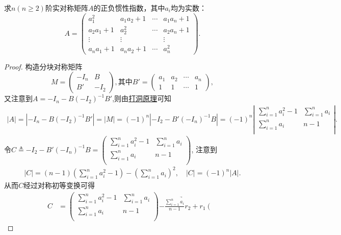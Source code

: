 \documentclass[../../main.tex]{subfiles}%
\begin{document}
\begin{proposition}
求\(n(n\geqslant 2)\)阶实对称矩阵\(A\)的正负惯性指数，其中\(a_i\)均为实数：
\[
A = \begin{pmatrix}
a_1^2 & a_1a_2 + 1 & \cdots & a_1a_n + 1 \\
a_2a_1 + 1 & a_2^2 & \cdots & a_2a_n + 1 \\
\vdots & \vdots & & \vdots \\
a_na_1 + 1 & a_na_2 + 1 & \cdots & a_n^2
\end{pmatrix}.
\]
\end{proposition} 
\begin{proof}
构造分块对称矩阵
\[
M = \begin{pmatrix}
-I_n & B \\
B' & -I_2
\end{pmatrix}, \text{其中} B' = \begin{pmatrix}
a_1 & a_2 & \cdots & a_n \\
1 & 1 & \cdots & 1
\end{pmatrix},
\]
又注意到$A=-I_n-B(-I_2)^{-1}B'$,则由\hyperref[proposition:打洞原理]{打洞原理}可知
\begin{align*}
\left| A \right|=\left| -I_n-B(-I_2)^{-1}B' \right|=\left| M \right|=\left( -1 \right) ^n\left| -I_2-B' (-I_n)^{-1}B \right|=\left( -1 \right) ^n\left| \begin{matrix}
\sum_{i=1}^n{a_{i}^{2}}-1&		\sum_{i=1}^n{a_i}\\
\sum_{i=1}^n{a_i}&		n-1\\
\end{matrix} \right|.
\end{align*}
令$C\triangleq -I_2-B' (-I_n)^{-1}B=\left( \begin{matrix}
\sum_{i=1}^n{a_{i}^{2}}-1&		\sum_{i=1}^n{a_i}\\
\sum_{i=1}^n{a_i}&		n-1\\
\end{matrix} \right) $,
注意到
\begin{align*}
|C|=\left( n-1 \right) \left( \sum_{i=1}^n{a_{i}^{2}}-1 \right) -\left( \sum_{i=1}^n{a_i} \right) ^2,\quad |C|=(-1)^n|A|.
\end{align*}
从而$C$经过对称初等变换可得
\begin{align*}
C&=\left( \begin{matrix}
\sum_{i=1}^n{a_{i}^{2}}-1&		\sum_{i=1}^n{a_i}\\
\sum_{i=1}^n{a_i}&		n-1\\
\end{matrix} \right) \underrightarrow{-\frac{\sum\limits_{i=1}^n{a_i}}{n-1}r_2+r_1}\left( \begin{matrix}

\end{matrix}
\end{align*}
\end{proof}
\end{document}
